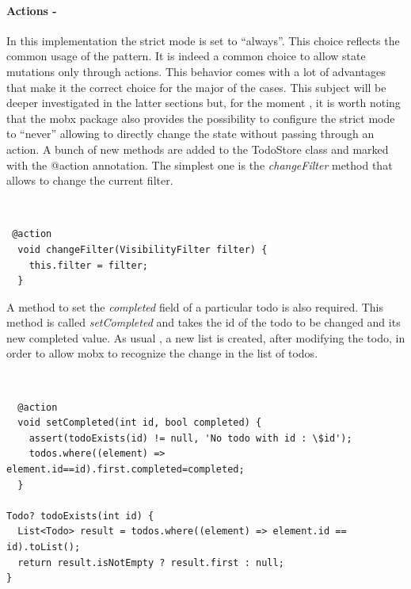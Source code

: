 \paragraph{Actions - }
\label{subpar:todo_app_bloc_core_state}In this implementation the strict mode is set to “always”. This choice reflects the common usage of the pattern. It is indeed a common choice to allow state mutations only through actions. This behavior comes with a lot of advantages that make it the correct choice for the major of the cases. This subject will be deeper investigated in the latter sections but, for the moment , it is worth noting that the mobx package also provides the possibility to configure the strict mode to “never”  allowing to directly change the state without passing through an action.  A bunch of new methods are added to the TodoStore class and marked with the @action annotation. The simplest one is the \textit{changeFilter} method that allows to change the current filter.
\begin{code}
\mbox{}\\
 \mbox{}
		\label{code:2.14}
\begin{verbatim} 
 @action
  void changeFilter(VisibilityFilter filter) {
    this.filter = filter;
  }
\end{verbatim}
\mbox{}
\end{code}

A method to set the \textit{completed} field of a particular todo is also required. This method is called \textit{setCompleted} and takes the id of the todo to be changed and its new completed value. As usual , a new list is created, after modifying the todo, in order to allow mobx to recognize the change in the list of todos.
\begin{code}
\mbox{}\\
 \mbox{}
		\label{code:2.14}
\begin{verbatim}
  @action
  void setCompleted(int id, bool completed) {
    assert(todoExists(id) != null, 'No todo with id : \$id');
    todos.where((element) => element.id==id).first.completed=completed;
  }

Todo? todoExists(int id) {
  List<Todo> result = todos.where((element) => element.id == id).toList();
  return result.isNotEmpty ? result.first : null;
}
\end{verbatim}
\mbox{}
\end{code}

